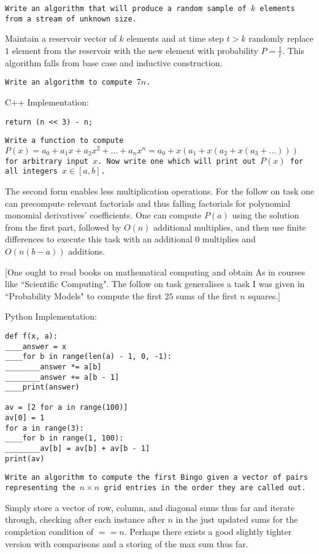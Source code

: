 \texttt{Write an algorithm that will produce a random sample of $k$ elements from a stream of unknown size.}

Maintain a reservoir vector of $k$ elements and at time step $t>k$ randomly replace $1$ element from the reservoir with the new element with probability $P=\frac{1}{t}$. This algorithm falls from base case and inductive construction.

\texttt{Write an algorithm to compute $7n$.}

C++ Implementation:

\begin{verbatim}
return (n << 3) - n;
\end{verbatim}

\texttt{Write a function to compute $P(x)=a_0+a_1 x+a_2 x^2 + \dots + a_n x^n=a_0+x(a_1+x(a_2+x(a_3+\dots)))$ for arbitrary input $x$. Now write one which will print out $P(x)$ for all integers $x \in [a,b]$.}

The second form enables less multiplication operations. For the follow on task one can precompute relevant factorials and thus falling factorials for polynomial monomial derivatives' coefficients. One can compute $P(a)$ using the solution from the first part, followed by $O(n)$ additional multiplies, and then use finite differences to execute this task with an additional $0$ multiplies and $O(n(b-a))$ additions.

[One ought to read books on mathematical computing and obtain As in courses like ``Scientific Computing". The follow on task generalises a task I was given in ``Probability Models" to compute the first $25$ sums of the first $n$ squares.]

Python Implementation:

\begin{verbatim}
def f(x, a):
____answer = x
____for b in range(len(a) - 1, 0, -1):
________answer *= a[b]
________answer += a[b - 1]
____print(answer)

av = [2 for a in range(100)]
av[0] = 1
for a in range(3):
____for b in range(1, 100):
________av[b] = av[b] + av[b - 1]
print(av)
\end{verbatim}

\texttt{Write an algorithm to compute the first Bingo given a vector of pairs representing the $n \times n$ grid entries in the order they are called out.}

Simply store a vector of row, column, and diagonal sums thus far and iterate through, checking after each instance after $n$ in the just updated sums for the completion condition of $==n$. Perhaps there exists a good slightly tighter version with comparisons and a storing of the max sum thus far.

